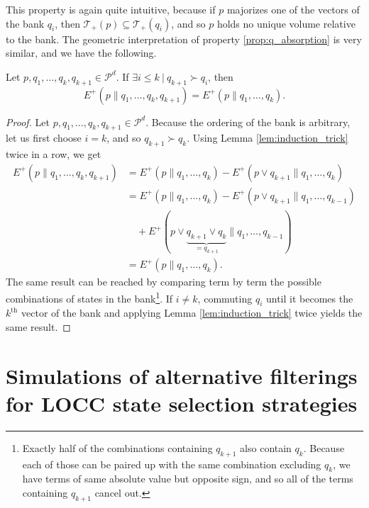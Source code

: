 This property is again quite intuitive, because if $p$ majorizes one of the vectors of the bank $q_i$, then $\mathcal{T}_+(p) \subseteq \mathcal{T}_+(q_i)$, and so $p$ holds no unique volume relative to the bank. The geometric interpretation of property \ref{prop:q_absorption} is very similar, and we have the following.

\begin{appendix_lemma}
    Let $p, q_1, \dots, q_k, q_{k+1} \in \mathcal{P}^d$. If $\exists i \leq k \: | \: q_{k+1} \succ q_i$, then
    \begin{equation}
        E^+(p \parallel q_1, \dots, q_k, q_{k+1}) = E^+(p \parallel q_1, \dots, q_k).
    \end{equation}
\end{appendix_lemma}

\begin{proof}
    Let $p, q_1, \dots, q_k, q_{k+1} \in \mathcal{P}^d$.  Because the ordering of the bank is arbitrary, let us first choose $i = k$, and so $q_{k+1} \succ q_k$. Using Lemma \ref{lem:induction_trick} twice in a row, we get
    \begin{align}
        E^+(p \parallel q_1, \dots, q_k, q_{k+1}) &= E^+(p \parallel q_1, \dots, q_k) - E^+(p \vee q_{k+1} \parallel q_1, \dots, q_k)\\
                                                  &= E^+(p \parallel q_1, \dots, q_k) - E^+(p \vee q_{k+1} \parallel q_1, \dots, q_{k-1})\nonumber\\
                                                  &\quad + E^+(p \vee \underbrace{q_{k+1} \vee q_k}_{= q_{k+1}} \parallel q_1, \dots, q_{k-1})\\
                                                  &= E^+(p \parallel q_1, \dots, q_k).
    \end{align}
    The same result can be reached by comparing term by term the possible combinations of states in the bank\footnote{Exactly half of the combinations containing $q_{k+1}$ also contain $q_k$. Because each of those can be paired up with the same combination excluding $q_k$, we have terms of same absolute value but opposite sign, and so all of the terms containing $q_{k+1}$ cancel out.}. If $i \neq k$, commuting $q_i$ until it becomes the $k^\text{th}$ vector of the bank and applying Lemma \ref{lem:induction_trick} twice yields the same result. 
\end{proof}



\newpage

\section{Simulations of alternative filterings for LOCC state selection strategies} \label{app:alternative_filterings}

\setcounter{equation}{0}

